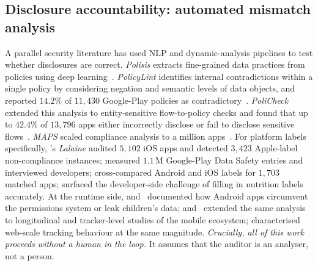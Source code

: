 \documentclass[11pt,a4paper]{article}
\begin{document}
\subsection{Disclosure accountability: automated mismatch analysis}
A parallel security literature has used NLP and dynamic-analysis pipelines
to test whether disclosures are correct. \emph{Polisis} extracts
fine-grained data practices from policies using deep
learning~\citep{harkous2018polisis}. \emph{PolicyLint} identifies internal
contradictions within a single policy by considering negation and semantic
levels of data objects, and reported $14.2\%$ of $11{,}430$ Google-Play
policies as contradictory~\citep{andow2019policylint}.
\emph{PoliCheck} extended this analysis to entity-sensitive
flow-to-policy checks and found that up to $42.4\%$ of $13{,}796$ apps
either incorrectly disclose or fail to disclose sensitive
flows~\citep{andow2020policheck}. \emph{MAPS} scaled compliance analysis to
a million apps~\citep{zimmeck2019maps,zimmeck2017automated}. For platform
labels specifically, \citet{xiao2023lalaine}'s \emph{Lalaine} audited
$5{,}102$ iOS apps and detected $3{,}423$ Apple-label non-compliance
instances; \citet{khandelwal2024unpacking} measured $1.1\,$M Google-Play
Data Safety entries and interviewed developers;
\citet{khandelwal2023comparing} cross-compared Android and iOS labels for
$1{,}703$ matched apps; \citet{li2022understanding} surfaced the
developer-side challenge of filling in nutrition labels accurately. At the
runtime side, \citet{reardon2019fifty} and~\citet{reyes2018wont} documented
how Android apps circumvent the permissions system or leak children's data;
\citet{razaghpanah2018apps} and~\citet{ren2018bug} extended the same
analysis to longitudinal and tracker-level studies of the mobile
ecosystem; \citet{englehardt2016online} characterised web-scale tracking
behaviour at the same magnitude. \emph{Crucially, all of this work
proceeds without a human in the loop.} It assumes that the auditor is an
analyser, not a person.
\end{document}
